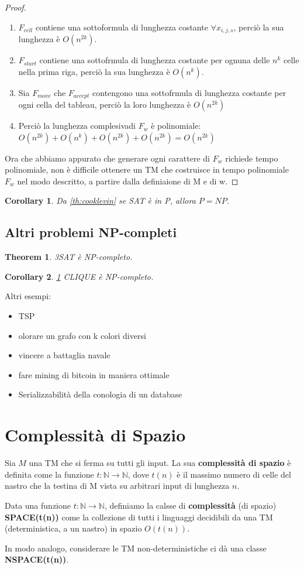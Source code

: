 \documentclass[a4paper, 12pt]{article}
\newtheorem{theorem}{Theorem}[section]
\newtheorem{corollary}{Corollary}[theorem]
\begin{document}
\begin{proof}
\begin{enumerate}
\item $F_{cell}$ contiene una sottoformula di lunghezza costante $\forall x_{i,j,s}$, perci\`o la sua lunghezza \`e $O(n^{2k})$.
\item $F_{start}$ contiene una sottofrmula di lunghezza costante per ognuna delle $n^{k}$ celle nella prima riga, perci\`o la sua lunghezza \`e $O(n^{k})$.
\item Sia $F_{move}$ che $F_{accept}$ contengono una sottofrmula di lunghezza costante per ogni cella del tableau, perci\`o la loro lunghezza \`e $O(n^{2k})$
\item Perci\`o la lunghezza complesivadi $F_w$ \`e polinomiale: $O(n^{2k}) + O(n^k) + O(n^{2k}) + O(n^{2k}) = O(n^{2k})$
\end{enumerate}
Ora che abbiamo appurato che generare ogni carattere di $F_w$ richiede tempo polinomiale, non \`e difficile ottenere un TM che costruisce in tempo polinomiale $F_w$ nel modo descritto, a partire dalla definiaione di M e di w.
\end{proof}

\begin{corollary}
Da \ref{th:cooklevin} se SAT \`e in P, allora $P=NP$.
\end{corollary}

\subsection{Altri problemi NP-completi}
\begin{theorem}
\label{th:3sat_np}
3SAT \`e NP-completo.
\end{theorem}
\begin{corollary}
\ref{th:3sat_np}
CLIQUE \`e NP-completo.
\end{corollary}
Altri esempi:
\begin{itemize}
\item TSP
\item olorare un grafo con k colori diversi
\item vincere a battaglia navale
\item fare mining di bitcoin in maniera ottimale
\item Serializzabilit\`a della conologia di un database
\end{itemize}
\section{Complessit\`a di Spazio}
Sia $M$ una TM che si ferma su tutti gli input. La sua \textbf{complessit\`a di spazio} \`e definita come la funzione $t: \mathbb{N} \rightarrow \mathbb{N}$, dove $t(n)$ \`e il massimo numero di celle del nastro che la testina di M vista su arbitrari input di lunghezza $n$.\\
\begin{center}
Data una funzione $t:\mathbb{N} \rightarrow \mathbb{N}$, definiamo la calsse di \textbf{complessit\`a } (di spazio) \textbf{SPACE(t(n))} come la collezione di tutti i linguaggi decidibili da una TM (deterministica, a un nastro) in spazio $O(t(n))$.
\end{center}
In modo analogo, considerare le TM non-deterministiche ci d\`a una classe  \textbf{NSPACE(t(n))}.
\end{document}
